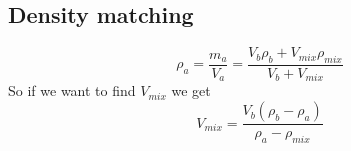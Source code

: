 \subsection{Density matching}
\begin{equation}
\rho_{a} = 	\frac {m_{a}}{V_{a}} =
				\frac{V_{b}\rho_{b} + V_{mix}\rho_{mix}}{V_b + V_{mix}} 
\end{equation}
So if we want to find $V_{mix}$ we get
\begin{equation}
V_{mix} = \frac{ V_{b}(\rho_{b} - \rho_{a})}{\rho_{a} - \rho_{mix}} 
\end{equation}


